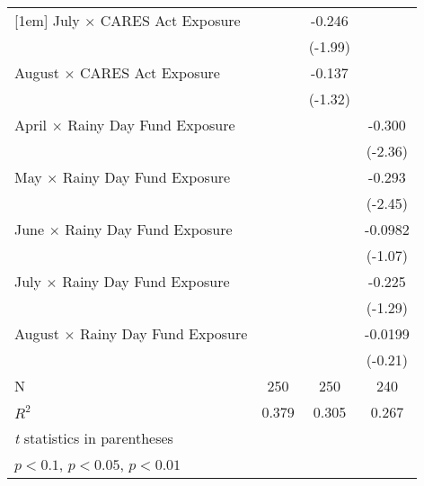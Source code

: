 {\begin{tabular}{l*{3}{c}}
[1em]
July $\times$ CARES Act Exposure&                     &      -0.246\sym{*}  &                     \\
                    &                     &     (-1.99)         &                     \\
[1em]
August $\times$ CARES Act Exposure&                     &      -0.137         &                     \\
                    &                     &     (-1.32)         &                     \\
[1em]
April $\times$ Rainy Day Fund Exposure&                     &                     &      -0.300\sym{**} \\
                    &                     &                     &     (-2.36)         \\
[1em]
May $\times$ Rainy Day Fund Exposure&                     &                     &      -0.293\sym{**} \\
                    &                     &                     &     (-2.45)         \\
[1em]
June $\times$ Rainy Day Fund Exposure&                     &                     &     -0.0982         \\
                    &                     &                     &     (-1.07)         \\
[1em]
July $\times$ Rainy Day Fund Exposure&                     &                     &      -0.225         \\
                    &                     &                     &     (-1.29)         \\
[1em]
August $\times$ Rainy Day Fund Exposure&                     &                     &     -0.0199         \\
                    &                     &                     &     (-0.21)         \\
\hline
N                   &         250         &         250         &         240         \\
$ R^2$              &       0.379         &       0.305         &       0.267         \\
\hline\hline
\multicolumn{4}{l}{\footnotesize \textit{t} statistics in parentheses}\\
\multicolumn{4}{l}{\footnotesize \sym{*} \(p<0.1\), \sym{**} \(p<0.05\), \sym{***} \(p<0.01\)}\\
\end{tabular}
}
